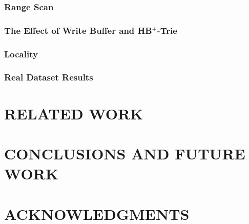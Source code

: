 \documentclass[lang=cn]{cls/elegantpaper}
\begin{document}
\subsubsection{Range Scan}

\subsubsection{The Effect of Write Buffer and HB$^+$-Trie}

\subsubsection{Locality}

\subsubsection{Real Dataset Results}

\section{RELATED WORK}

\section{CONCLUSIONS AND FUTURE WORK}

\section{ACKNOWLEDGMENTS}


\end{document}
